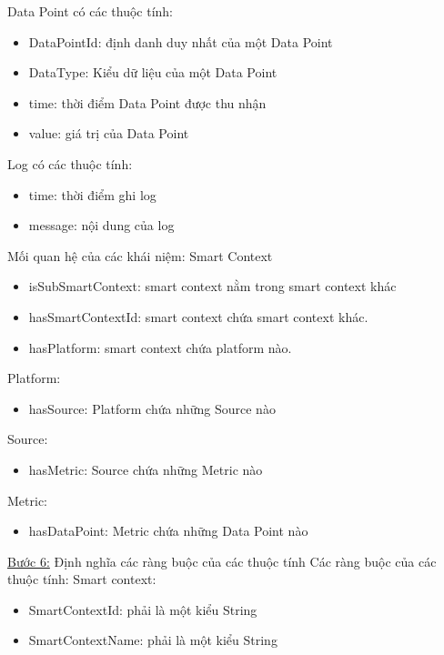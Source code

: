 \hspace{0mm}Data Point có các thuộc tính:
\begin{itemize}
	\item DataPointId: định danh duy nhất của một Data Point
	\item DataType: Kiểu dữ liệu của một Data Point
	\item time: thời điểm Data Point được thu nhận
	\item value: giá trị của Data Point
\end{itemize}


\hspace{0mm}Log có các thuộc tính:
\begin{itemize}
	\item time: thời điểm ghi log
	\item message: nội dung của log
\end{itemize}

\hspace{0mm}Mối quan hệ của các khái niệm:
\hspace{0mm}Smart Context
\begin{itemize}
	\item isSubSmartContext: smart context nằm trong smart context khác 
	\item hasSmartContextId: smart context chứa smart context khác.
	\item hasPlatform: smart context chứa platform nào.
\end{itemize}

\hspace{0mm}Platform:
\begin{itemize}
	\item hasSource: Platform chứa những Source nào
\end{itemize}

\hspace{0mm}Source:
\begin{itemize}
	\item hasMetric: Source chứa những Metric nào
\end{itemize}

\hspace{0mm}Metric:
\begin{itemize}
	\item hasDataPoint: Metric chứa những Data Point nào
\end{itemize}

\underline{Bước 6:} Định nghĩa các ràng buộc của các thuộc tính
\hspace{0mm}Các ràng buộc của các thuộc tính:
\hspace{0mm}Smart context: 
\begin{itemize}
	\item SmartContextId: phải là một kiểu String
	\item SmartContextName: phải là một kiểu String
\end{itemize}

